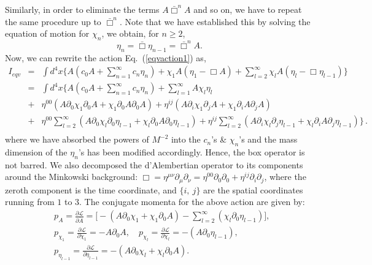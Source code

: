 \documentclass[a4paper,12pt]{article}
\newcommand{\bbox}{\bar{\Box}}
\newcommand{\+}{^{\dagger}}
\newcommand{\2}{\frac{1}{2}}
\newcommand{\3}{\frac{1}{3}}
\newcommand{\4}{\frac{1}{4}}
\newcommand{\6}{\frac{1}{6}}
\newcommand{\8}{\frac{1}{8}}
\begin{document}
\noindent
Similarly, in order to eliminate the terms $A\bbox^{n}A$ and so on,
we have to repeat the same procedure up to $\bbox^n$. Note that we have established this by
solving the equation of motion for $\chi_{n}$, we obtain, for $n \geq 2$, 
\begin{equation}
\eta_{n}=\bbox \eta_{n-1}=\bbox^{n}A.
\end{equation}
Now, we can rewrite the action Eq.~(\ref{eqvaction1}) as,
\begin{eqnarray}\label{eqvv2}
I_{eqv}&=&\int d^{4}x\Bigg\{A(c_{0}A+\sum^{\infty}_{n=1}c_n\eta_{n})+\chi_{1}A(\eta_{1}-\Box
A) +\sum
^{\infty}_{l=2}\chi_lA(\eta_l-\Box \eta_{l-1})\Bigg\}\nonumber\\
&=&\int d^{4}x\Bigg\{A(c_{0}A+\sum^{\infty}_{n=1}c_n\eta_{n})+\sum
^{\infty}_{l=1}A\chi_l
\eta_l\nonumber\\
&+&\eta^{00}(A\partial_0\chi_1  \partial_0 A+\chi_1
\partial_0 A
\partial_0 A)+\eta^{ij}(A\partial_i\chi_1  \partial_j A+\chi_1
\partial_i A
\partial_j A)\nonumber\\
&+&\eta^{00}\sum^{\infty}_{l=2}(A\partial_0\chi_{l}  \partial_0\eta_{l-1}
+\chi_l
\partial_0 A
\partial_0 \eta_{l-1})+\eta^{ij}\sum^{\infty}_{l=2}(A\partial_i\chi_{l}  \partial_j\eta_{l-1}
+\chi_l
\partial_i A
\partial_j \eta_{l-1}) 
\Bigg\}\,.\nonumber\\
\end{eqnarray}
where we have absorbed the powers of $M^{-2}$ into the $c_{n}$'s \& $\chi_{n}$'s and the mass dimension of the $\eta_{n}$'s has been modified accordingly.
Hence, the
box operator is not barred. 
We also  decomposed the d'Alembertian operator to its components around the Minkowski background: $\Box=\eta^{\mu\nu}\partial_\mu\partial_\nu=\eta^{00}\partial_0\partial_0+\eta^{ij}\partial _{i}\partial_{j}$, where the zeroth component is the time coordinate, and $\{i,~j\}$ are the spatial coordinates running from $1$ to $3$. 
The conjugate momenta for the above action are given by:
\begin{eqnarray}
&&p_A=\frac{\partial\mathcal{L}}{\partial\dot{A}}=\Big[-(A\partial_0\chi_1
 +\chi_1
\partial_0 A)-\sum^{\infty}_{l=2}(\chi_l\partial_0 \eta_{l-1})\Big],\quad
\nonumber\\
&&p_{\chi_1}=\frac{\partial\mathcal{L}}{\partial\dot{\chi}_1}=-A\partial_0
A,\quad p_{\chi_l}=\frac{\partial\mathcal{L}}{\partial\dot{\chi}_l}=-(A\partial_0\eta_{l-1}),\quad\nonumber\\
&&p_{\eta_{l-1}}=\frac{\partial\mathcal{L}}{\partial\dot{\eta}_{l-1}}=-(A\partial_0\chi_l
+\chi_l
\partial_0 A).
\end{eqnarray}
\end{document}
